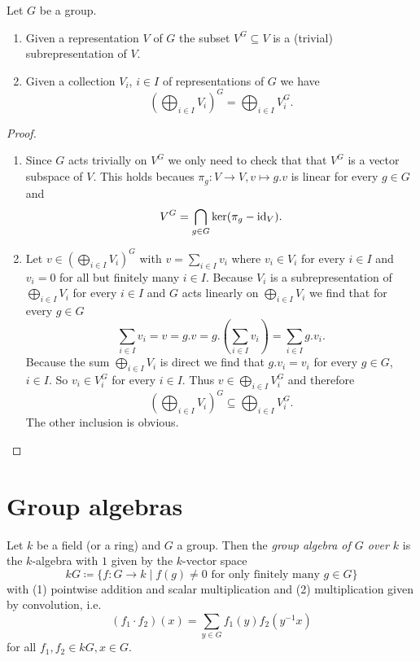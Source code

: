 \begin{lem}\label{lem: direct sum and invariants commute}
 Let $G$ be a group.
 \begin{enumerate}[label=\emph{\alph*)},leftmargin=*]
  \item
   Given a representation $V$ of $G$ the subset $V^G \subseteq V$ is a (trivial) subrepresentation of $V$.
  \item
   Given a collection $V_i$, $i \in I$ of representations of $G$ we have
   \[
    \left( \bigoplus_{i \in I} V_i \right)^G = \bigoplus_{i \in I} V_i^G.
   \]
 \end{enumerate}
\end{lem}
\begin{proof}
 \begin{enumerate}[label=\emph{\alph*)},leftmargin=*]
  \item
   Since $G$ acts trivially on $V^G$ we only need to check that that $V^G$ is a vector subspace of $V$. This holds becaues $\pi_g \colon V \to V, v \mapsto g.v$ is linear for every $g \in G$ and
   \[
    V^G = \bigcap_{g \in G} \ker(\pi_g - \operatorname{id}_V).
   \]
  \item
   Let $v \in \left( \bigoplus_{i \in I} V_i \right)^G$ with $v = \sum_{i \in I} v_i$ where $v_i \in V_i$ for every $i \in I$ and $v_i = 0$ for all but finitely many $i \in I$. Because $V_i$ is a subrepresentation of $\bigoplus_{i \in I} V_i$ for every $i \in I$ and $G$ acts linearly on $\bigoplus_{i \in I} V_i$ we find that for every $g \in G$
   \[
    \sum_{i \in I} v_i
    = v
    = g.v
    = g.\left( \sum_{i \in I} v_i \right)
    = \sum_{i \in I} g.v_i.
   \]
   Because the sum $\bigoplus_{i \in I} V_i$ is direct we find that $g.v_i = v_i$ for every $g \in G$, $i \in I$. So $v_i \in V_i^G$ for every $i \in I$. Thus $v \in \bigoplus_{i \in I} V_i^G$ and therefore
   \[
    \left( \bigoplus_{i \in I} V_i \right)^G \subseteq \bigoplus_{i \in I} V_i^G.
   \]
   The other inclusion is obvious.
 \end{enumerate}
\end{proof}





\section{Group algebras}


\begin{defi}
 Let $k$ be a field (or a ring) and $G$ a group. Then the \emph{group algebra of $G$ over $k$} is the $k$-algebra with $1$ given by the $k$-vector space
 \[
  kG \coloneqq \{f \colon G \to k \mid f(g) \neq 0 \text{ for only finitely many } g \in G\}
 \]
 with (1) pointwise addition and scalar multiplication and (2) multiplication given by convolution, i.e.\
 \[
  (f_1 \cdot f_2)(x) = \sum_{y \in G} f_1(y) f_2\left(y^{-1}x\right)
 \]
 for all $f_1, f_2 \in kG, x \in G$.
\end{defi}

